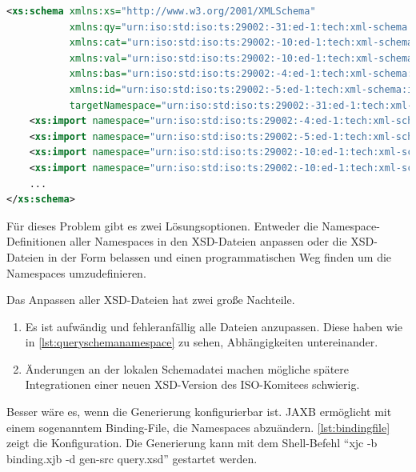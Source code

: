 
\begin{lstlisting}[caption=query.xsd Namespace Definitionen, language=XML, label=lst:queryschemanamespace]
<xs:schema xmlns:xs="http://www.w3.org/2001/XMLSchema"
           xmlns:qy="urn:iso:std:iso:ts:29002:-31:ed-1:tech:xml-schema:query"
           xmlns:cat="urn:iso:std:iso:ts:29002:-10:ed-1:tech:xml-schema:catalogue"
           xmlns:val="urn:iso:std:iso:ts:29002:-10:ed-1:tech:xml-schema:value"
           xmlns:bas="urn:iso:std:iso:ts:29002:-4:ed-1:tech:xml-schema:basic"
           xmlns:id="urn:iso:std:iso:ts:29002:-5:ed-1:tech:xml-schema:identifier"
           targetNamespace="urn:iso:std:iso:ts:29002:-31:ed-1:tech:xml-schema:query" elementFormDefault="qualified">
    <xs:import namespace="urn:iso:std:iso:ts:29002:-4:ed-1:tech:xml-schema:basic" schemaLocation="basic.xsd"/>
    <xs:import namespace="urn:iso:std:iso:ts:29002:-5:ed-1:tech:xml-schema:identifier" schemaLocation="identifier.xsd"/>
    <xs:import namespace="urn:iso:std:iso:ts:29002:-10:ed-1:tech:xml-schema:catalogue" schemaLocation="catalogue.xsd"/>
    <xs:import namespace="urn:iso:std:iso:ts:29002:-10:ed-1:tech:xml-schema:value" schemaLocation="value.xsd"/>
    ...
</xs:schema>    
\end{lstlisting}

Für dieses Problem gibt es zwei Lösungsoptionen. Entweder die Namespace-Definitionen aller Namespaces in den XSD-Dateien anpassen oder die XSD-Dateien in der Form belassen und einen programmatischen Weg finden um die Namespaces umzudefinieren. 

Das Anpassen aller XSD-Dateien hat zwei große Nachteile.
\begin{enumerate}
\item Es ist aufwändig und fehleranfällig alle Dateien anzupassen. Diese haben wie in \autoref{lst:queryschemanamespace} zu sehen, Abhängigkeiten untereinander.
\item Änderungen an der lokalen Schemadatei machen mögliche spätere Integrationen einer neuen XSD-Version des ISO-Komitees schwierig.
\end{enumerate}

Besser wäre es, wenn die Generierung konfigurierbar ist. \gls{JAXB} ermöglicht mit einem sogenanntem Binding-File, die Namespaces abzuändern. \autoref{lst:bindingfile} zeigt die Konfiguration. Die Generierung kann mit dem Shell-Befehl \enquote{xjc -b binding.xjb -d gen-src query.xsd} gestartet werden.  

